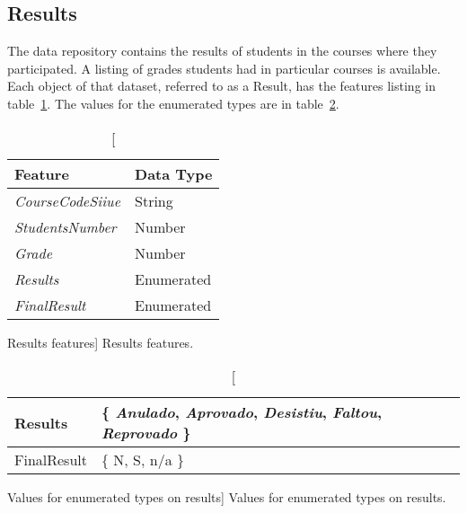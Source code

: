 \subsection{Results}
\label{sec:results}

The data repository contains the results of students in the courses where they
participated. A listing of grades students had in particular courses is
available. Each object of that dataset, referred to as a Result, has the
features listing in table~\ref{tab:results_fetures}. The values for the
enumerated types are in table~\ref{tab:results_fetures_enum}.

\begin{table}[h!]
    \centering

    \begin{tabular}{l l}
        Feature                  & Data Type  \\ \hline
        \textit{CourseCodeSiiue} & String     \\
        \textit{StudentsNumber}  & Number     \\
        \textit{Grade}           & Number     \\
        \textit{Results}         & Enumerated \\
        \textit{FinalResult}     & Enumerated \\
    \end{tabular}

    \caption
        [Results features]
        {Results features.}

    \label{tab:results_fetures}
\end{table}

\begin{table}[h!]
    \centering

    \begin{tabular}{| l | l |}
        \hline
        Results & \{ \textit{Anulado},
                     \textit{Aprovado},
                     \textit{Desistiu},
                     \textit{Faltou},
                     \textit{Reprovado}
                  \} \\ \hline
        FinalResult & \{ N, S, n/a \}  \\ \hline
    \end{tabular}

    \caption
        [Values for enumerated types on results]
        {Values for enumerated types on results.}

    \label{tab:results_fetures_enum}
\end{table}

